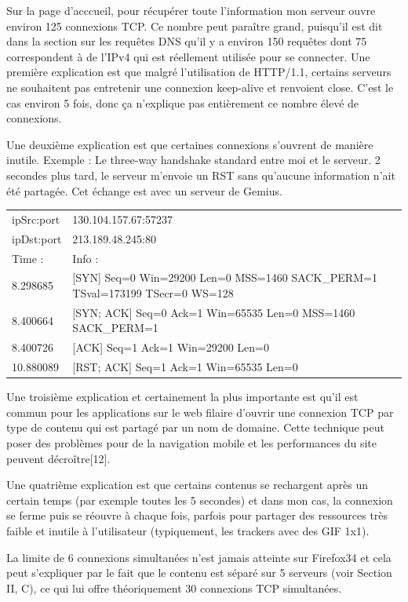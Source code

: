 \documentclass[conference]{IEEEtran}
\begin{document}
Sur la page d'acccueil, pour récupérer toute l'information mon serveur ouvre environ 125 connexions TCP. Ce nombre peut paraître grand, puisqu'il est dit dans la section sur les requêtes DNS qu'il y a environ 150 requêtes dont 75 correspondent à de l'IPv4 qui est réellement utilisée pour se connecter. Une première explication est que malgré l'utilisation de HTTP/1.1, certains serveurs ne souhaitent pas entretenir une connexion keep-alive et renvoient close. C'est le cas environ 5 fois, donc ça n'explique pas entièrement ce nombre élevé de connexions.

Une deuxième explication est que certaines connexions s'ouvrent de manière inutile. Exemple : Le three-way handshake standard entre moi et le serveur. 2 secondes plus tard, le serveur m'envoie un RST sans qu'aucune information n'ait été partagée. Cet échange est avec un serveur de Gemius.

\begin{tabular}{|l|p{5cm}|}
 \hline
 ipSrc:port & 130.104.157.67:57237 \\
 ipDst:port & 213.189.48.245:80 \\
 \hline
 Time : & Info : \\
 8.298685 & [SYN] Seq=0 Win=29200 Len=0 MSS=1460 SACK\_PERM=1 TSval=173199 TSecr=0 WS=128 \\
 8.400664 & [SYN; ACK] Seq=0 Ack=1 Win=65535 Len=0 MSS=1460 SACK\_PERM=1 \\
 8.400726 & [ACK] Seq=1 Ack=1 Win=29200 Len=0 \\
 10.880089 & [RST; ACK] Seq=1 Ack=1 Win=65535 Len=0 \\
 \hline
\end{tabular}

Une troisième explication et certainement la plus importante est qu'il est commun pour les applications sur le web filaire d'ouvrir une connexion TCP par type de contenu qui est partagé par un nom de domaine. Cette technique peut poser des problèmes pour de la navigation mobile et les performances du site peuvent décroître[12].

Une quatrième explication est que certains contenus se rechargent après un certain temps (par exemple toutes les 5 secondes) et dans mon cas, la connexion se ferme puis se réouvre à chaque fois, parfois pour partager des ressources très faible et inutile à l'utilisateur (typiquement, les trackers avec des GIF 1x1).

La limite de 6 connexions simultanées n'est jamais atteinte sur Firefox34 et cela peut s'expliquer par le fait que le contenu est séparé sur 5 serveurs (voir Section II, C), ce qui lui offre théoriquement 30 connexions TCP simultanées.
\end{document}
